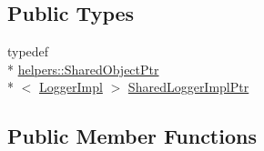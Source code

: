 \subsection*{Public Types}
\begin{DoxyCompactItemize}
\item 
typedef \\*
\hyperlink{classlog4cplus_1_1helpers_1_1SharedObjectPtr}{helpers\-::\-Shared\-Object\-Ptr}\\*
$<$ \hyperlink{classlog4cplus_1_1spi_1_1LoggerImpl}{Logger\-Impl} $>$ \hyperlink{classlog4cplus_1_1spi_1_1LoggerImpl_a714f4769a8d2b7f954eb193df7bcd256}{Shared\-Logger\-Impl\-Ptr}
\end{DoxyCompactItemize}
\subsection*{Public Member Functions}
